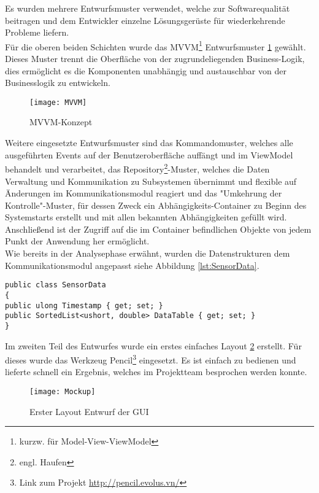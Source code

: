Es wurden mehrere Entwurfsmuster verwendet, welche zur Softwarequalität beitragen und dem Entwickler einzelne Lösungsgerüste für wiederkehrende Probleme liefern.\\

Für die oberen beiden Schichten wurde das MVVM\footnote{kurzw. für Model-View-ViewModel} Entwurfsmuster \ref{fig:mvvm} gewählt. Dieses Muster trennt die Oberfläche von der zugrundeliegenden Business-Logik, dies ermöglicht es die Komponenten unabhängig und austauschbar von der Businesslogik zu entwickeln.\\ 

\begin{figure}[h]
	\centering
		\texttt{[image: MVVM]}
		\caption{MVVM-Konzept}
		\label{fig:mvvm}
\end{figure}

Weitere eingesetzte Entwurfsmuster sind das Kommandomuster, welches alle ausgeführten Events auf der Benutzeroberfläche auffängt und im ViewModel behandelt und verarbeitet, das Repository\footnote{engl. Haufen}-Muster, welches die Daten Verwaltung und Kommunikation zu Subsystemen übernimmt und flexible auf Änderungen im Kommunikationsmodul reagiert und das "Umkehrung der Kontrolle"-Muster, für dessen Zweck ein Abhängigkeits-Container zu Beginn des Systemstarts erstellt und mit allen bekannten Abhängigkeiten gefüllt wird. Anschließend ist der Zugriff auf die im Container befindlichen Objekte von jedem Punkt der Anwendung her ermöglicht.\\

Wie bereits in der Analysephase erwähnt, wurden die Datenstrukturen dem Kommunikationsmodul angepasst siehe Abbildung \ref{lst:SensorData}.\\
\begin{lstlisting}[frame=single, caption=Beschreibung der Sensordatenstruktur, label=lst:SensorData]
public class SensorData
{
public ulong Timestamp { get; set; }
public SortedList<ushort, double> DataTable { get; set; }
}
\end{lstlisting}
Im zweiten Teil des Entwurfes wurde ein erstes einfaches Layout \ref{fig:gui} erstellt. Für dieses wurde das Werkzeug Pencil\footnote{Link zum Projekt \url{http://pencil.evolus.vn/}} eingesetzt. Es ist einfach zu bedienen und lieferte schnell ein Ergebnis, welches im Projektteam besprochen werden konnte.

\begin{figure}[h]
	\centering
		\texttt{[image: Mockup]}
		\caption{Erster Layout Entwurf der GUI}
		\label{fig:gui}
\end{figure}


